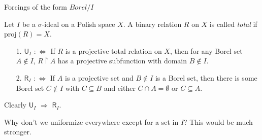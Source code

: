 \documentclass[handout, dvipsnames, usenames, 9pt, serif]{beamer}
\newcommand{\U}{\mathsf{U}}
\newcommand{\R}{\mathsf{R}}
\newcommand{\cb}{\color{blue}}
\begin{document}
\begin{frame}{Forcings of the form $Borel/I$} 

Let $I$ be a $\sigma$-ideal on a Polish space $X$. 
A binary relation $R$ on $X$ is called \emph{total} if $\mathrm{proj}(R)=X$. 
\pause 

\begin{definition} 
\begin{enumerate} 
\smallskip 
\item[1.] 
$\U_{I}$ $:\Longleftrightarrow$ 
If $R$ is a projective total relation on $X$, 
then for any Borel set $A\notin I$, $R{\upharpoonright}A$ has a {\cb projective subfunction} with domain $B\notin I$. 
\smallskip \pause 
\item[2.] 
$\R_{I}$ $:\Longleftrightarrow$ 
If $A$ is a projective set and 
$B\notin I$ is a Borel set, then there is some Borel set $C\notin I$ with $C\subseteq B$ and either {\cb $C\cap A=\emptyset$} or {\cb $C\subseteq A$}. 
\end{enumerate} 
\end{definition} 

\medskip 
Clearly $\U_{I}$ $\Longrightarrow$ $\R_{I}$. 

\pause 
\medskip 
Why don't we uniformize everywhere except for a set in $I$? This would be much stronger. 


\end{frame} 
\end{document}

